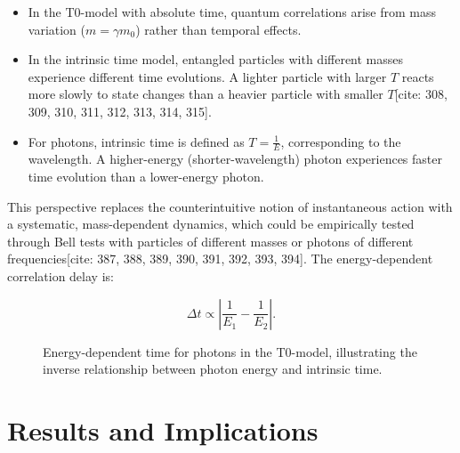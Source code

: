 \documentclass[a4paper,12pt]{article}
\theoremstyle{definition}
\theoremstyle{remark}
\begin{document}
	\begin{itemize}
		\item In the T0-model with absolute time, quantum correlations arise from mass variation (\( m = \gamma m_0 \)) rather than temporal effects.
		\item In the intrinsic time model, entangled particles with different masses experience different time evolutions. A lighter particle with larger \( T \) reacts more slowly to state changes than a heavier particle with smaller \( T \)[cite: 308, 309, 310, 311, 312, 313, 314, 315].
		\item For photons, intrinsic time is defined as \( T = \frac{1}{E} \), corresponding to the wavelength. A higher-energy (shorter-wavelength) photon experiences faster time evolution than a lower-energy photon.
	\end{itemize}
	
	This perspective replaces the counterintuitive notion of instantaneous action with a systematic, mass-dependent dynamics, which could be empirically tested through Bell tests with particles of different masses or photons of different frequencies[cite: 387, 388, 389, 390, 391, 392, 393, 394]. The energy-dependent correlation delay is:
	
	\begin{equation}
		\Delta t \propto \left| \frac{1}{E_1} - \frac{1}{E_2} \right|.
	\end{equation}
	
	\begin{figure}[h]
		\centering
		\caption{Energy-dependent time for photons in the T0-model, illustrating the inverse relationship between photon energy and intrinsic time.}
		\label{fig:energy_time_photons}
	\end{figure}
	
	\section{Results and Implications}
	
\end{document}
